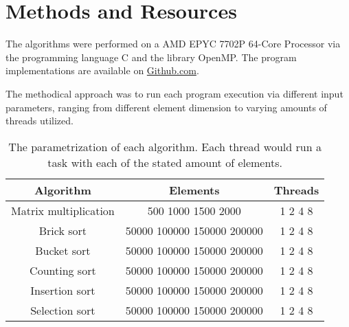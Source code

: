 \chapter{Methods and Resources}

The algorithms were performed on a AMD EPYC 7702P 64-Core Processor via the programming language C and the library OpenMP.
The program implementations are available on \href{https://github.com/ThompsonA93/C-Slurm-Benchmark}{Github.com}.

The methodical approach was to run each program execution via different input parameters, ranging from different element 
dimension to varying amounts of threads utilized.

\begin{table}[H]
    \centering
    \begin{tabular}{|c|c|c|}\hline
        Algorithm & Elements & Threads \\\hline
        Matrix multiplication & 500 1000 1500 2000 & 1 2 4 8 \\\hline
        Brick sort & 50000 100000 150000 200000 & 1 2 4 8 \\\hline
        Bucket sort & 50000 100000 150000 200000 & 1 2 4 8 \\\hline
        Counting sort & 50000 100000 150000 200000 & 1 2 4 8  \\\hline
        Insertion sort & 50000 100000 150000 200000 & 1 2 4 8 \\\hline
        Selection sort & 50000 100000 150000 200000 & 1 2 4 8 \\\hline
    \end{tabular}
    \caption{The parametrization of each algorithm. Each thread would run a task with each of the stated amount of elements.}
    \label{tab:my_label}
\end{table}

